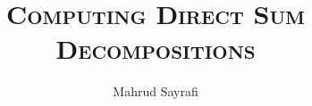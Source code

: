 \documentclass[beamer]{paper}
\begin{document}
\rmfamily
{}

\title[Computing Direct Sum Decompositions]
      {\textsc{Computing Direct Sum Decompositions}} %



\newcommand{\lc}{\MakeLowercase}
\author[Mahrud Sayrafi]{M\lc{ahrud} S\lc{ayrafi}}



\frame[plain]{\titlepage}
\end{document}
